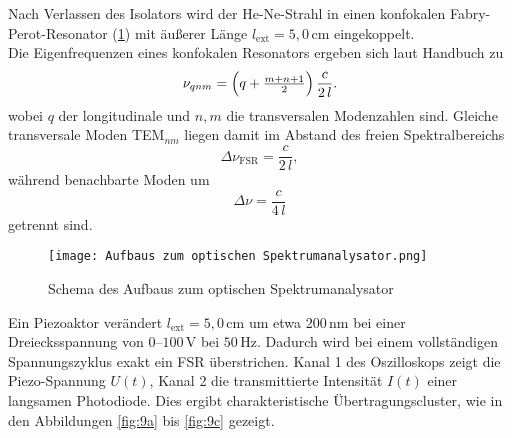 Nach Verlassen des Isolators wird der He-Ne-Strahl in einen konfokalen Fabry-Perot-Resonator (\cref{fig:Spektrumanalysator}) mit äußerer Länge $l_{\mathrm{ext}} = 5{,}0\,\si{\centi\meter}$ eingekoppelt. \\
Die Eigenfrequenzen eines konfokalen Resonators ergeben sich laut Handbuch \cite{praktikum} zu
\begin{equation}
  \nu_{qnm}
  = \Bigl(q + \tfrac{m+n+1}{2}\Bigr)\,\frac{c}{2\,l}.
\end{equation}
wobei \( q \) der longitudinale und \( n, m \) die transversalen Modenzahlen sind. 
Gleiche transversale Moden TEM$_{nm}$ liegen damit im Abstand des freien Spektralbereichs
\begin{equation*}
  \Delta\nu_{\mathrm{FSR}}
  = \frac{c}{2\,l},
\end{equation*}
während benachbarte Moden um
\begin{equation*}
  \Delta\nu
  = \frac{c}{4\,l}
\end{equation*}
getrennt sind.
\begin{figure}[htbp]
  \centering
  \texttt{[image: Aufbaus zum optischen Spektrumanalysator.png]}
  \caption{Schema des Aufbaus zum optischen Spektrumanalysator \cite{praktikum}}
  \label{fig:Spektrumanalysator}
\end{figure}
Ein Piezoaktor verändert \( l_{\mathrm{ext}} = 5{,}0\,\si{\centi\meter} \) um etwa \(200\,\si{\nano\meter}\) bei einer Dreiecksspannung von $0$–$100\,\si{\volt}$ bei $50\,\si{\hertz}$. 
Dadurch wird bei einem vollständigen Spannungszyklus exakt ein FSR überstrichen. 
Kanal 1 des Oszilloskops zeigt die Piezo-Spannung \( U(t) \), Kanal 2 die transmittierte Intensität \( I(t) \) einer langsamen Photodiode. 
Dies ergibt charakteristische Übertragungscluster, wie in den Abbildungen \cref{fig:9a} bis \cref{fig:9c} gezeigt.

